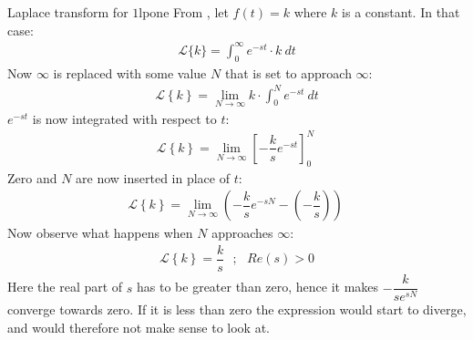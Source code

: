 \begin{example}{Laplace transform for $1$}{lpone}
From , let $f(t)=k$ where $k$ is a constant. In that case:
\begin{align*}
\mathcal{L}\{k\}=\int_{0}^{\infty} e^{-st} \cdot k\ dt
\end{align*}
Now $\infty$ is replaced with some value $N$ that is set to approach $\infty$:
\begin{align*}
\mathcal{L} \left\{k \right\}= \lim_{N \to \infty} k\cdot \int_{0}^{N} e^{-st}\ dt
\end{align*}
$e^{-st}$ is now integrated with respect to $t$:
\begin{align*}
\mathcal{L} \left\{k \right\}= \lim_{N \to \infty} \left[ -\dfrac{k}{s} e^{-st} \right]_{0}^{N} \ 
\end{align*}
Zero and $N$ are now inserted in place of $t$:
\begin{align*}
\mathcal{L} \left\{k \right\}= \lim_{N \to \infty} \left( -\dfrac{k}{s} e^{-sN} - \left(-\dfrac{k}{s}\right) \right) \ 
\end{align*}
Now observe what happens when $N$ approaches $\infty$:
\begin{align*}
\mathcal{L} \left\{k \right\}=\dfrac{k}{s} \ \ \ ; \ \ \ Re(s) > 0
\end{align*}
Here the real part of $s$ has to be greater than zero, hence it makes $-\dfrac{k}{se^{sN}}$ converge towards zero. If it is less than zero the expression would start to diverge, and would therefore not make sense to look at.
\end{example}

